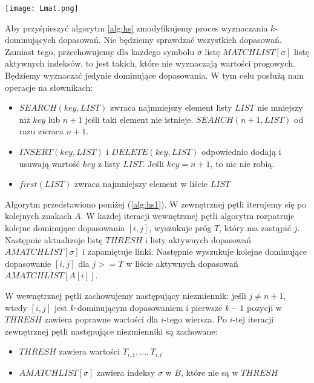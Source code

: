\documentclass[11pt]{article}
\begin{document}
\begin{center}
    \texttt{[image: Lmat.png]}
\end{center}

Aby przyśpieszyć algorytm \ref{alg:hs} zmodyfikujemy proces wyznaczania $k$-dominujących dopasowań. Nie będziemy sprawdzać wszystkich dopasowań. Zamiast tego, przechowujemy dla każdego symbolu $\sigma$ listę $MATCHLIST[\sigma]$ listę aktywnych indeksów, to jest takich, które nie wyznaczają wartości progowych. Będziemy wyznaczać jedynie dominujące dopasowania. W tym celu posłużą nam operacje na słownikach:

\begin{itemize}
    \item $SEARCH(key, LIST)$ zwraca najmniejszy element listy $LIST$ nie mniejszy niż $key$ lub $n+1$ jeśli taki element nie istnieje. $SEARCH(n+1, LIST)$ od razu zwraca $n+1$.
    \item $INSERT(key, LIST)$ i $DELETE(key, LIST)$ odpowiednio dodają i usuwają wartość $key$ z listy $LIST$. Jeśli $key = n+1$, to nic nie robią.
    \item $first(LIST)$ zwraca najmniejszy element w liście $LIST$
\end{itemize}

Algorytm przedstawiono poniżej (\ref{alg:hs1}). W zewnętrznej pętli iterujemy się po kolejnych znakach $A$. W każdej iteracji wewnętrznej pętli algorytm rozpatruje kolejne dominujące dopasowania $[i, j]$, wyszukuje próg $T$, który ma zastąpić $j$. Następnie aktualizuje listę $THRESH$ i listy aktywnych dopasowań $AMATCHLIST[\sigma]$ i zapamiętuje linki. Następnie wyszukuje kolejne dominujące dopasowanie $[i, j]$ dla $j >= T$ w liście aktywnych dopasowań $AMATCHLIST[A[i]]$.

W wewnętrznej pętli zachowujemy następujący niezmiennik: jeśli $j \ne n + 1$, wtedy $[i, j]$ jest $k$-dominującym dopasowaniem i pierwsze $k-1$ pozycji w $THRESH$ zawiera poprawne wartości dla $i$-tego wiersza. Po $i$-tej iteracji zewnętrznej pętli następujące niezmienniki są zachowane:

\begin{itemize}
    \item $THRESH$ zawiera wartości $T_{i, 1}, \dots, T_{i,l}$
    \item $AMATCHLIST[\sigma]$ zawiera indeksy $\sigma$ w $B$, które nie są w $THRESH$
\end{itemize}
\end{document}

